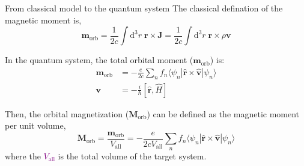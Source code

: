 \documentclass{beamer}
\newcommand{\purple}{\textcolor{purple}}
\begin{document}
    \begin{frame}{From classical model to the quantum system}
      The classical defination of the magnetic moment is, 
      \begin{equation}
        \bm{m}_{\text{orb}} = \frac{1}{2c}\int\mathrm{d}^3r\;\bm{r}\times\bm{J} = \frac{1}{2c}\int\mathrm{d}^3r\;\bm{r}\times\rho\bm{v}
      \end{equation} 
      
      In the quantum system, the total orbital moment (\(\bm{m}_{\text{orb}}\)) is:
      \begin{subequations}\begin{align}
        \bm{m}_{\text{orb}} &= -\frac{e}{2c}\sum_n f_n \langle\psi_n|\widehat{\bm{r}}\times\widehat{\bm{v}}|\psi_n\rangle\\
        \bm{v} &= -\frac{i}{\hbar}[\widehat{\bm{r}}, \widehat{H}]
      \end{align}\end{subequations}

      Then, the orbital magnetization (\(\bm{M}_{\text{orb}}\)) can be defined as the magnetic moment per unit volume, 
      \begin{equation}
        \bm{M}_{\text{orb}} = \frac{\bm{m}_{\text{orb}}}{V_{\text{all}}} = -\frac{e}{2cV_{\text{all}}}\sum_n f_n \langle\psi_n|\widehat{\bm{r}}\times\widehat{\bm{v}}|\psi_n\rangle
      \end{equation}
      where the \purple{\(V_{\text{all}}\)} is the total volume of the target system.
    \end{frame}
\end{document}
